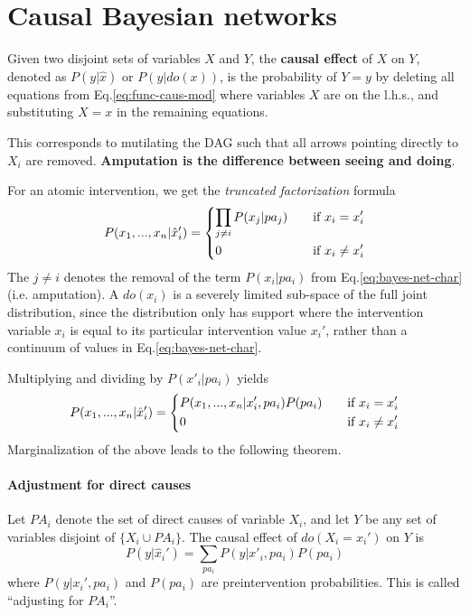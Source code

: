 \documentclass[11pt]{article}
\numberwithin{equation}{section}
\begin{document}
\section{Causal Bayesian networks}
Given two disjoint sets of variables $X$ and $Y$, the \textbf{causal effect} of $X$ on $Y$, denoted as $P(y|\hat{x})$ or $P(y|do(x))$, is the probability of $Y=y$ by deleting all equations from Eq.\eqref{eq:func-caus-mod} where variables $X$ are on the l.h.s., and substituting $X=x$ in the remaining equations.

This corresponds to mutilating the DAG such that all arrows pointing directly to $X_i$ are removed. \textbf{Amputation is the difference between seeing and doing}.

For an atomic intervention, we get the \textit{truncated factorization} formula
\begin{equation}
P(x_1,...,x_n|\hat{x}'_i)=\begin{dcases}
\prod_{j\neq i} P(x_j|pa_j) \quad &\text{if}\ x_i = x_i'\\
0 &\text{if}\ x_i \neq x_i'
\end{dcases}
\end{equation}
The $j\neq i$ denotes the removal of the term $P(x_i|pa_i)$ from Eq.\eqref{eq:bayes-net-char} (i.e. amputation). A $do(x_i)$ is a severely limited sub-space of the full joint distribution, since the distribution only has support where the intervention variable $x_i$ is equal to its particular intervention value $x_i'$, rather than a continuum of values in Eq.\eqref{eq:bayes-net-char}.

Multiplying and dividing by $P(x'_i|pa_i)$ yields
\begin{equation}
P(x_1,...,x_n|\hat{x}'_i)=\begin{dcases}
P(x_1,...,x_n|x_i',pa_i)P(pa_i) \quad &\text{if}\ x_i = x_i'\\
0 &\text{if}\ x_i \neq x_i'
\end{dcases}
\end{equation}
Marginalization of the above leads to the following theorem.

\paragraph{Adjustment for direct causes} 
Let $PA_i$ denote the set of direct causes of variable $X_i$, and let $Y$ be any set of variables disjoint of $\{X_i \cup PA_i \}$. The causal effect of $do(X_i=x_i')$ on $Y$ is
\begin{equation}
P(y|\hat{x}_i') = \sum_{pa_i} P(y | x'_i, pa_i) P(pa_i)
\end{equation}
where $P(y|x_i', pa_i)$ and $P(pa_i)$ are preintervention probabilities. This is called ``adjusting for $PA_i$''.
\end{document}
